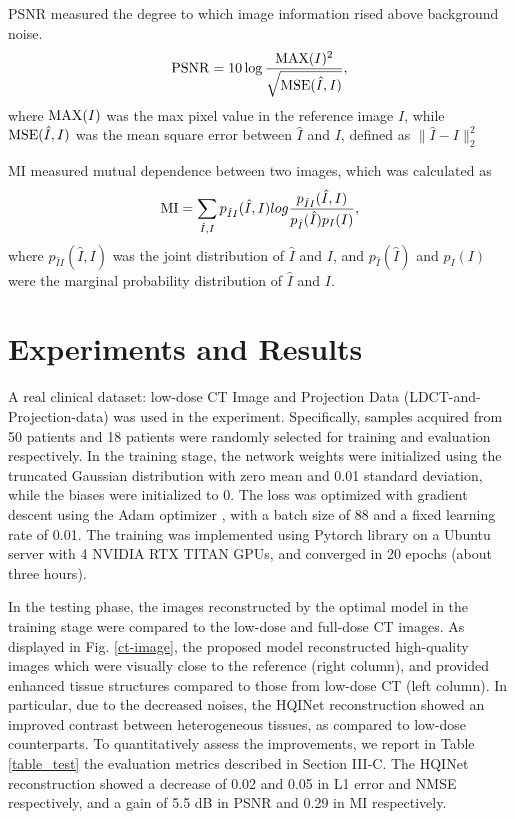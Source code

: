 \documentclass[conference]{IEEEtran}
\begin{document}
PSNR measured the degree to which image information rised above background noise.
\begin{equation}
\label{psnr}
{\rm PSNR} = 10 \log\frac{{\rm MAX}(I)^2}{\sqrt{{\rm MSE}(\hat I,I)}},
\end{equation}
where ${\rm MAX}(I)$ was the max pixel value in the reference image $I$, while ${\rm MSE} (\hat I,I)$ was the mean square error between $\hat I$ and $I$, defined as $\parallel \hat I - I \parallel _2^2$

MI measured mutual dependence between two images, which was calculated as
\begin{equation}
\label{mi}
{\rm MI} = \sum_{\hat{I},I}p_{\hat{I}I}(\hat{I},I)log\frac{p_{\hat{I}I}(\hat{I},I)}{p_{\hat I}(\hat{I})p_I(I)},
\end{equation}
where $p_{\hat{I}I}(\hat{I},I)$ was the joint distribution of $\hat I$ and $I$, and $p_{\hat I}(\hat I)$ and $p_I(I)$ were the marginal probability distribution of $\hat I$ and $I$.
\section{Experiments and Results}

A real clinical dataset: low-dose CT Image and Projection Data (LDCT-and-Projection-data) was used in the experiment. Specifically, samples acquired from 50 patients and 18 patients were randomly selected for training and evaluation respectively. In the training stage, the network weights were initialized using the truncated Gaussian distribution with zero mean and 0.01 standard deviation, while the biases were initialized to 0. The loss was optimized with gradient descent using the Adam optimizer \cite{kingma2014adam}, with a batch size of 88 and a fixed learning rate of 0.01. The training was implemented using Pytorch library on a Ubuntu server with 4 NVIDIA RTX TITAN GPUs, and converged in 20 epochs (about three hours).

In the testing phase, the images reconstructed by the optimal model in the training stage were compared to the low-dose and full-dose CT images. As displayed in Fig. \ref{ct-image}, the proposed model reconstructed high-quality images which were visually close to the reference (right column), and provided enhanced tissue structures compared to those from low-dose CT (left column). In particular, due to the decreased noises, the HQINet reconstruction showed an improved contrast between heterogeneous tissues, as compared to low-dose counterparts. To quantitatively assess the improvements, we report in Table \ref{table_test} the evaluation metrics described in Section III-C. The HQINet reconstruction showed a decrease of 0.02 and 0.05 in L1 error and NMSE respectively, and a gain of 5.5 dB in PSNR and 0.29 in MI respectively. 
\end{document}
